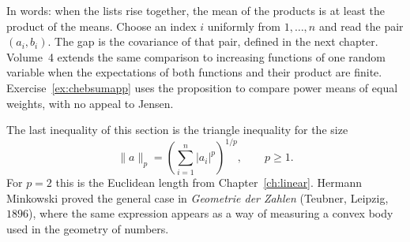 In words: when the lists rise together, the mean of the products is at least the product of the means. Choose an index $i$ uniformly from $1,\ldots,n$ and read the pair $(a_i,b_i)$. The gap is the covariance of that pair, defined in the next chapter. Volume~4 extends the same comparison to increasing functions of one random variable when the expectations of both functions and their product are finite. Exercise~\ref{ex:chebsumapp} uses the proposition to compare power means of equal weights, with no appeal to Jensen.

The last inequality of this section is the triangle inequality for the size
\[
\|a\|_p=\left(\sum_{i=1}^n|a_i|^p\right)^{1/p},\qquad p\ge1.
\]
For $p=2$ this is the Euclidean length from Chapter~\ref{ch:linear}. Hermann Minkowski proved the general case in \emph{Geometrie der Zahlen} (Teubner, Leipzig, $1896$), where the same expression appears as a way of measuring a convex body used in the geometry of numbers.


